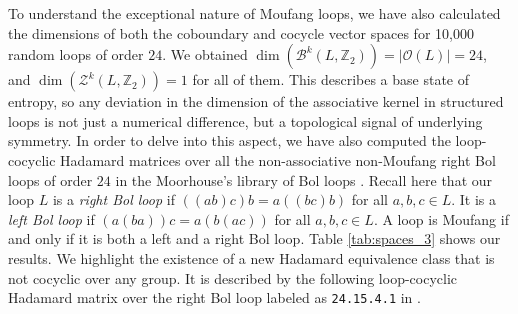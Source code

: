\documentclass[11pt,a4paper]{article}
\begin{document}
To understand the exceptional nature of Moufang loops, we have also calculated the dimensions of both the coboundary and cocycle vector spaces for 10,000 random loops of order $24$. We obtained $\dim(\mathcal{B}^k(L,\mathbb{Z}_2))=|\mathcal{O}(L)|=24$, and $\dim(\mathcal{Z}^k(L,\mathbb{Z}_2))=1$ for all of them. This describes a base state of entropy, so any deviation in the dimension of the associative kernel in structured loops is not just a numerical difference, but a topological signal of underlying symmetry. In order to delve into this aspect, we have also computed the loop-cocyclic Hadamard matrices over all the non-associative non-Moufang right Bol loops of order $24$ in the Moorhouse's library of Bol loops \citep{Moorhouse}. Recall here that our loop $L$ is a {\em right Bol loop} if $((ab)c)b=a((bc)b)$ for all $a,b,c\in L$. It is a {\em left Bol loop} if $(a(ba))c=a(b(ac))$ for all $a,b,c\in L$. A loop is Moufang if and only if it is both a left and a right Bol loop. Table \ref{tab:spaces_3} shows our results. We highlight the existence of a new Hadamard equivalence class that is not cocyclic over any group. It is described by the following loop-cocyclic Hadamard matrix over the right Bol loop labeled as \texttt{24.15.4.1} in \citep{Moorhouse}.
\end{document}
